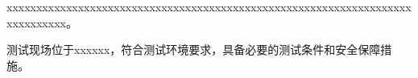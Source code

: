 xxxxxxxxxxxxxxxxxxxxxxxxxxxxxxxxxxxxxxxxxxxxxxxxxxxxxxxxxxxxxxxxxxxxxxxxxxxxxx。

测试现场位于xxxxxx，符合测试环境要求，具备必要的测试条件和安全保障措施。
